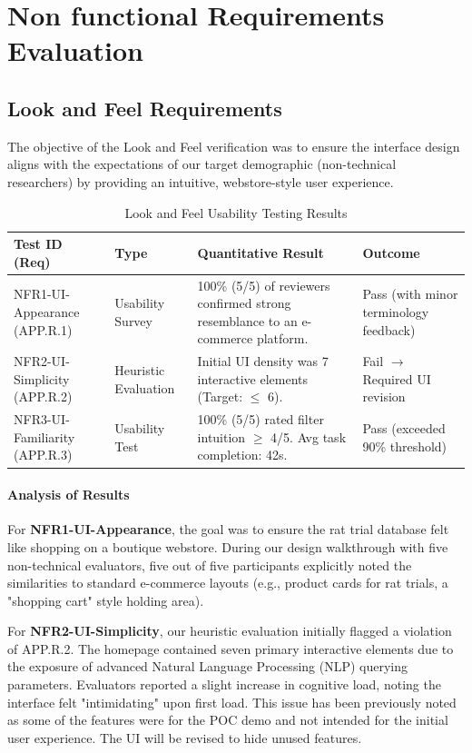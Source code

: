 \documentclass[12pt, titlepage]{article}
\begin{document}
\section{Non functional Requirements Evaluation}

\subsection{Look and Feel Requirements}
\label{sec:look_and_feel_results}

The objective of the Look and Feel verification was to ensure the interface design aligns with the expectations of our target demographic (non-technical researchers) by providing an intuitive, webstore-style user experience.

\begin{table}[h!]
\centering
\caption{Look and Feel Usability Testing Results}

\label{tab:lookandfeel_results}
\begin{tabular}{|p{3cm}|p{2cm}|p{4.5cm}|p{4cm}|}
\hline
\textbf{Test ID (Req)} & \textbf{Type} & \textbf{Quantitative Result} & \textbf{Outcome} \\ \hline
NFR1-UI-Appearance (APP.R.1) & Usability Survey & 100\% (5/5) of reviewers confirmed strong resemblance to an e-commerce platform. & Pass (with minor terminology feedback) \\ \hline
NFR2-UI-Simplicity (APP.R.2) & Heuristic Evaluation & Initial UI density was 7 interactive elements (Target: $\le$ 6). & Fail $\rightarrow$ Required UI revision \\ \hline
NFR3-UI-Familiarity (APP.R.3) & Usability Test & 100\% (5/5) rated filter intuition $\ge$ 4/5. Avg task completion: 42s. & Pass (exceeded 90\% threshold) \\ \hline
\end{tabular}
\end{table}

\paragraph{Analysis of Results}
For \textbf{NFR1-UI-Appearance}, the goal was to ensure the rat trial database felt like shopping on a boutique webstore. During our design walkthrough with five non-technical evaluators, five out of five participants explicitly noted the similarities to standard e-commerce layouts (e.g., product cards for rat trials, a "shopping cart" style holding area). 

For \textbf{NFR2-UI-Simplicity}, our heuristic evaluation initially flagged a violation of APP.R.2. The homepage contained seven primary interactive elements due to the exposure of advanced Natural Language Processing (NLP) querying parameters. Evaluators reported a slight increase in cognitive load, noting the interface felt "intimidating" upon first load. This issue has been previously noted as some of the features were for the POC demo and not intended for the initial user experience. The UI will be revised to hide unused features.
\end{document}
